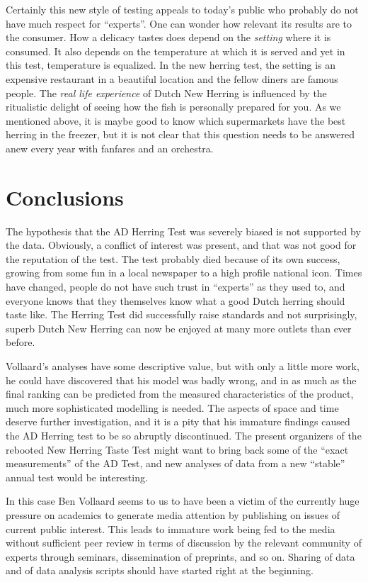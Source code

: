\documentclass[alpha-refs]{wiley-article}
\begin{document}
Certainly this new style of testing appeals to today's public who probably do not have much respect for ``experts''. One can wonder how relevant its results are to the consumer. How a delicacy tastes does depend on the \emph{setting} where it is consumed. It also depends on the temperature at which it is served and yet in this test, temperature is equalized. In the new herring test, the setting is an expensive restaurant in a beautiful location and the fellow diners are famous people. The \emph{real life experience} of Dutch New Herring is influenced by the ritualistic delight of seeing how the fish is personally prepared for you. As we mentioned above, it is maybe good to know which supermarkets have the best herring in the freezer, but it is not clear that this question needs to be answered anew every year with fanfares and an orchestra.

\section{Conclusions}\label{conclusion}

The hypothesis that the AD Herring Test was severely biased is not supported by the data. Obviously, a conflict of interest was present, and that was not good for the reputation of the test. The test probably died because of its own success, growing from some fun in a local newspaper to a high profile national icon. Times have changed, people do not have such trust in ``experts'' as they used to, and everyone knows that they themselves know what a good Dutch herring should taste like. The Herring Test did successfully raise standards and not surprisingly, superb Dutch New Herring can now be enjoyed at many more outlets than ever before.

Vollaard's analyses have some descriptive value, but with only a little more work, he could have discovered that his model was badly wrong, and in as much as the final ranking can be predicted from the measured characteristics of the product, much more sophisticated modelling is needed.  The aspects of space and time deserve further investigation, and it is a pity that his immature findings caused the AD Herring test to be so abruptly discontinued. The present organizers of the rebooted New Herring Taste Test might want to bring back some of the ``exact measurements'' of the AD Test, and new analyses of data from a new ``stable'' annual test would be interesting.

In this case Ben Vollaard seems to us to have been a victim of the currently huge pressure on academics to generate media attention by publishing on issues of current public interest. This leads to immature work being fed to the media without sufficient peer review in terms of discussion by the relevant community of experts through seminars, dissemination of preprints, and so on. Sharing of data and of data analysis scripts should have started right at the beginning.
\end{document}
